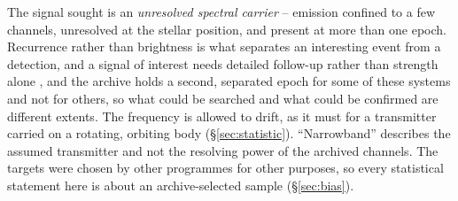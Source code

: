 The signal sought is an \emph{unresolved spectral carrier} -- emission confined
to a few channels, unresolved at the stellar position, and present at more
than one epoch. Recurrence rather than brightness is what separates an
interesting event from a detection, and a signal of interest needs detailed
follow-up rather than strength alone \citep{Sheikh2021}, and the archive holds
a second, separated epoch for some of these systems and not for others, so
what could be searched and what could be confirmed are different extents. The
frequency is allowed to drift, as it must for a transmitter carried on a
rotating, orbiting body (\S\ref{sec:statistic}). ``Narrowband'' describes the
assumed transmitter and not the resolving power of the archived channels. The
targets were chosen by other programmes for other purposes, so every
statistical statement here is about an archive-selected sample
(\S\ref{sec:bias}).
